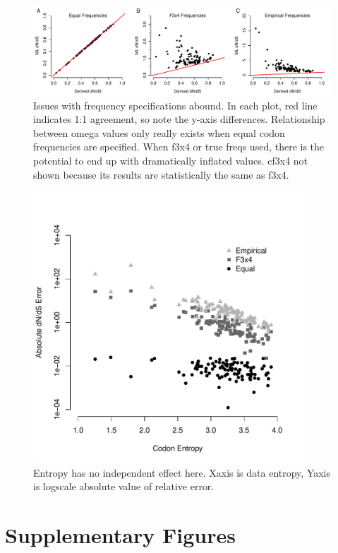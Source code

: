 \documentclass[11pt]{article}
\begin{document}
\bigskip
\begin{figure}[H]
\centerline{\includegraphics[width=6in]{figures/regression_fspec_kappatrue.pdf}}
\caption{\label{reg_fspec} Issues with frequency specifications abound. In each plot, red line indicates 1:1 agreement, so note the y-axis differences. Relationship between omega values only really exists when equal codon frequencies are specified. When f3x4 or true freqs used, there is the potential to end up with dramatically inflated values. cf3x4 not shown because its results are statistically the same as f3x4.}
\end{figure}

\bigskip
\begin{figure}[H]
\centerline{\includegraphics[width=4in]{figures/entropy_error_fspec.pdf}}
\caption{\label{entropyerror} Entropy has no independent effect here. Xaxis is data entropy, Yaxis is logscale absolute value of relative error.}
\end{figure}



\clearpage
\newpage

\section*{Supplementary Figures}
\end{document}
